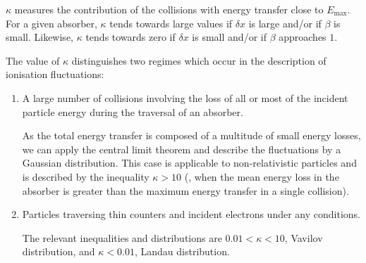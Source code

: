 $\kappa$ measures the contribution of the collisions with energy transfer close to $E_{\mathrm{max}}$.  For a given absorber, $\kappa$ tends towards large values if $\delta x$ is large and/or if $\beta$ is small.  Likewise, $\kappa$ tends towards zero if $\delta x $ is small and/or if $\beta$ approaches $1$.

The value of $\kappa$ distinguishes two regimes which occur in the description of ionisation fluctuations:

\begin{enumerate}
\item A large number of collisions involving the loss of all or most of the incident particle energy during the traversal of an absorber.

As the total energy transfer is composed of a multitude of small energy losses, we can apply the central limit theorem and describe the fluctuations by a Gaussian distribution. This case is applicable to non-relativistic particles and is described by the inequality $\kappa > 10 $ (\ie, when the mean energy loss in the absorber is greater than the maximum energy transfer in a single collision).

\item Particles traversing thin counters and incident electrons under any conditions.

The relevant inequalities and distributions are $ 0.01 < \kappa < 10 $, Vavilov distribution, and $\kappa < 0.01 $, Landau distribution.
\end{enumerate}

